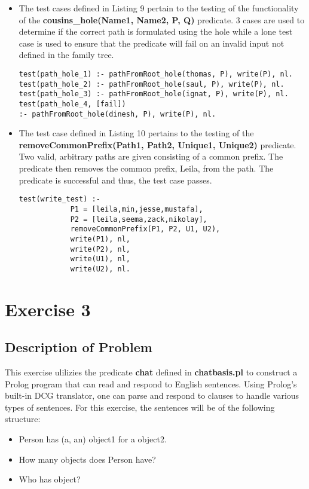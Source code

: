 \documentclass[11pt]{article}
\newcommand{\forceindent}{\leavevmode{\parindent=1em\indent}}
\begin{document}
\begin{itemize}
\item 
The test cases defined in Listing 9 pertain to the testing of the functionality of the \textbf{cousins\_hole(Name1, Name2, P, Q)} predicate. 3 cases are used to determine if the correct path is formulated using the hole while a lone test case is used to ensure that the predicate will fail on an invalid input not defined in the family tree.
\begin{lstlisting}[caption= Functionality of Hole, label= Listing 9]
test(path_hole_1) :- pathFromRoot_hole(thomas, P), write(P), nl.
test(path_hole_2) :- pathFromRoot_hole(saul, P), write(P), nl.
test(path_hole_3) :- pathFromRoot_hole(ignat, P), write(P), nl.
test(path_hole_4, [fail]) 
:- pathFromRoot_hole(dinesh, P), write(P), nl.
\end{lstlisting}


\item
The test case defined in Listing 10 pertains to the testing of the \textbf{removeCommonPrefix(Path1, Path2, Unique1, Unique2)} predicate. Two valid, arbitrary paths are given consisting of a common prefix. The predicate then removes the common prefix, Leila, from the path. The predicate is successful and thus, the test case passes.
\begin{lstlisting}[caption= Correct Paths \& Common Prefix Removed, label= Listing 10]
test(write_test) :- 
            P1 = [leila,min,jesse,mustafa],
            P2 = [leila,seema,zack,nikolay],
            removeCommonPrefix(P1, P2, U1, U2), 
            write(P1), nl,
            write(P2), nl, 
            write(U1), nl,
            write(U2), nl.
\end{lstlisting}

\end{itemize} 	

\section{Exercise 3}
	\subsection{Description of Problem}
\forceindent This exercise ulilizies the predicate \textbf{chat} defined in \textbf{chatbasis.pl} to construct a Prolog program that can read and respond to English sentences. Using Prolog's built-in DCG translator, one can parse and respond to clauses to handle various types of sentences. For this exercise, the sentences will be of the following structure:
\begin{itemize}
\item Person has (a, an) object1 for a object2.
\item How many objects does Person have?
\item Who has object?
\end{itemize} 
\end{document}
